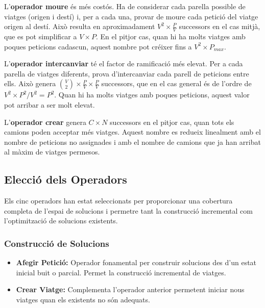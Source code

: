 L'\textbf{operador moure} és més costós. Ha de considerar cada parella possible de viatges (origen i destí) i, per a cada una, provar de moure cada petició del viatge origen al destí. Això resulta en aproximadament $V^2 \times \frac{P}{V}$ successors en el cas mitjà, que es pot simplificar a $V \times P$. En el pitjor cas, quan hi ha molts viatges amb poques peticions cadascun, aquest nombre pot créixer fins a $V^2 \times P_{max}$.

\vspace{0.5em}
L'\textbf{operador intercanviar} té el factor de ramificació més elevat. Per a cada parella de viatges diferents, prova d'intercanviar cada parell de peticions entre ells. Això genera $\binom{V}{2} \times \frac{P}{V} \times \frac{P}{V}$ successors, que en el cas general és de l'ordre de $V^2 \times P^2 / V^2 = P^2$. Quan hi ha molts viatges amb poques peticions, aquest valor pot arribar a ser molt elevat.

\vspace{0.5em}
L'\textbf{operador crear} genera $C \times N$ successors en el pitjor cas, quan tots els camions poden acceptar més viatges. Aquest nombre es redueix linealment amb el nombre de peticions no assignades i amb el nombre de camions que ja han arribat al màxim de viatges permesos.

\vspace{0.5cm}

\subsection{Elecció dels Operadors}

Els cinc operadors han estat seleccionats per proporcionar una cobertura completa de l'espai de solucions i permetre tant la construcció incremental com l'optimització de solucions existents.

\vspace{0.5cm}

\subsubsection{Construcció de Solucions}
\begin{itemize}
    \item \textbf{Afegir Petició:} Operador fonamental per construir solucions des d'un estat inicial buit o parcial. Permet la construcció incremental de viatges.
    \item \textbf{Crear Viatge:} Complementa l'operador anterior permetent iniciar nous viatges quan els existents no són adequats.
\end{itemize}

